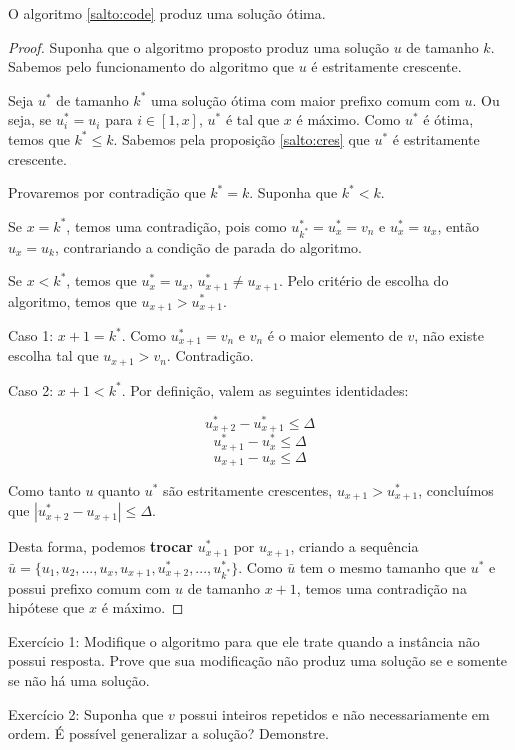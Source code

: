 \begin{theo} \label{salto:proof}
O algoritmo \ref{salto:code} produz uma solução ótima.
\end{theo}
\begin{proof}

Suponha que o algoritmo proposto produz uma solução $u$ de tamanho $k$. Sabemos pelo funcionamento do algoritmo que $u$ é estritamente crescente.

Seja $u^*$ de tamanho $k^*$ uma solução ótima com maior prefixo comum com $u$. Ou seja, se $u^*_i = u_i$ para $i \in [1, x]$, $u^*$ é tal que $x$ é máximo. Como $u^*$ é ótima, temos que $k^* \leq k$. Sabemos pela proposição \ref{salto:cres} que $u^*$ é estritamente crescente.

Provaremos por contradição que $k^* = k$.  Suponha que $k^* < k$.

Se $x = k^*$, temos uma contradição, pois como $u^*_{k^*} = u^*_x = v_n$ e $u^*_x = u_x$, então $u_x = u_k$, contrariando a condição de parada do algoritmo. 

Se $x < k^*$, temos que $u^*_{x} = u_{x}$, $u^*_{x + 1} \neq u_{x + 1}$. Pelo critério de escolha do algoritmo, temos que $u_{x + 1} > u^*_{x + 1}$.

Caso 1: $x + 1 = k^*$. Como $u^*_{x + 1} = v_n$ e $v_n$ é o maior elemento de $v$, não existe escolha tal que $u_{x + 1} > v_n$. Contradição.

Caso 2: $x + 1 < k^*$. Por definição, valem as seguintes identidades:

$$u^*_{x + 2} - u^*_{x + 1} \leq \Delta$$
$$u^*_{x + 1} - u^*_{x} \leq \Delta$$
$$u_{x + 1} - u_{x} \leq \Delta$$

Como tanto $u$ quanto $u^*$ são estritamente crescentes, $u_{x + 1} > u^*_{x + 1}$, concluímos que $|u^*_{x + 2} - u_{x + 1}| \leq \Delta$.

Desta forma, podemos \textbf{trocar} $u^*_{x + 1}$ por $u_{x + 1}$, criando a sequência $\bar{u} = \{u_1, u_2, ..., u_x, u_{x + 1}, u^*_{x + 2}, ..., u^*_{k^*}\}$. Como $\bar{u}$ tem o mesmo tamanho que $u^*$ e possui prefixo comum com $u$ de tamanho $x + 1$, temos uma contradição na hipótese que $x$ é máximo.

\end{proof}

Exercício 1: Modifique o algoritmo para que ele trate quando a instância não possui resposta. Prove que sua modificação não produz uma solução se e somente se não há uma solução.

Exercício 2: Suponha que $v$ possui inteiros repetidos e não necessariamente em ordem. É possível generalizar a solução? Demonstre.

